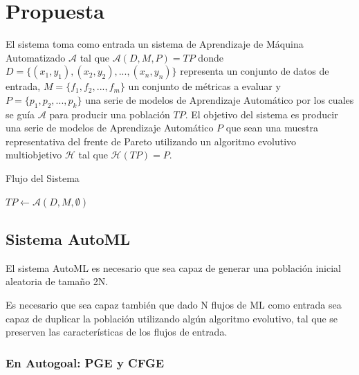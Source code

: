 
\chapter{Propuesta}\label{chapter:proposal}
El sistema toma como entrada un sistema de Aprendizaje de M\'aquina Automatizado $\mathcal{A}$ tal que $\mathcal{A}(D, M, P) = TP$ donde $D = \{(x_1, y_1), (x_2, y_2), ..., (x_n, y_n)\}$ representa un conjunto de datos de entrada, $M = \{f_1, f_2, ..., f_m\}$ un conjunto de m\'etricas a evaluar y $P = \{p_1, p_2, ..., p_k\}$ una serie de modelos de Aprendizaje Autom\'atico por los cuales se gu\'ia $\mathcal{A}$ para producir una poblaci\'on $TP$. El objetivo del sistema es producir una serie de modelos de Aprendizaje Autom\'atico $P $ que sean una muestra representativa del frente de Pareto utilizando un algoritmo evolutivo multiobjetivo  $\mathcal{H}$ tal que $\mathcal{H}(TP) = P$. 

\begin{algorithm}\caption{Flujo del Sistema}
    
    $TP \gets \mathcal{A}(D, M, \emptyset)$ 
\end{algorithm}

\section{Sistema AutoML}
El sistema AutoML es necesario que sea capaz de generar una poblaci\'on inicial aleatoria de tamaño 2N. 

Es necesario que sea capaz tambi\'en que dado N flujos de ML como entrada sea capaz de duplicar la poblaci\'on utilizando alg\'un algoritmo evolutivo, tal que se preserven las caracter\'isticas de los flujos de entrada. 

\subsection{En Autogoal: PGE y CFGE}

